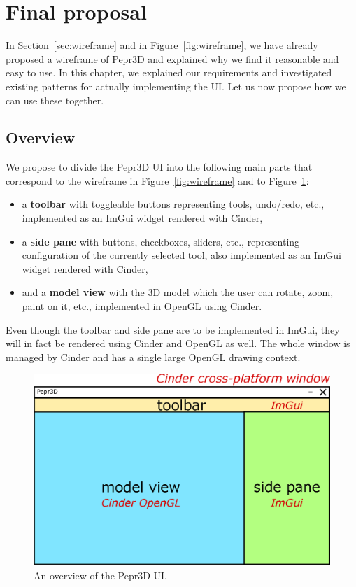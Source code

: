 \section{Final proposal}

In Section~\ref{sec:wireframe} and in Figure~\ref{fig:wireframe}, we have already proposed a wireframe of Pepr3D and explained why we find it reasonable and easy to use.
In this chapter, we explained our requirements and investigated existing patterns for actually implementing the UI.
Let us now propose how we can use these together.

\subsection{Overview}

We propose to divide the Pepr3D UI into the following main parts that correspond to the wireframe in Figure~\ref{fig:wireframe} and to Figure~\ref{fig:uioverview}:
%
\begin{itemize}
\setlength\itemsep{0em}
\item a \textbf{toolbar} with toggleable buttons representing tools, undo/redo, etc., implemented as an ImGui widget rendered with Cinder,
\item a \textbf{side pane} with buttons, checkboxes, sliders, etc., representing configuration of the currently selected tool, also implemented as an ImGui widget rendered with Cinder,
\item and a \textbf{model view} with the 3D model which the user can rotate, zoom, paint on it, etc., implemented in OpenGL using Cinder.
\end{itemize}

Even though the toolbar and side pane are to be implemented in ImGui, they will in fact be rendered using Cinder and OpenGL as well.
The whole window is managed by Cinder and has a single large OpenGL drawing context.

\begin{figure}[h]
	\centering
	\includegraphics[scale=0.65]{images/uioverview.eps}
	\caption{An overview of the Pepr3D UI.}
	\label{fig:uioverview}
\end{figure}

